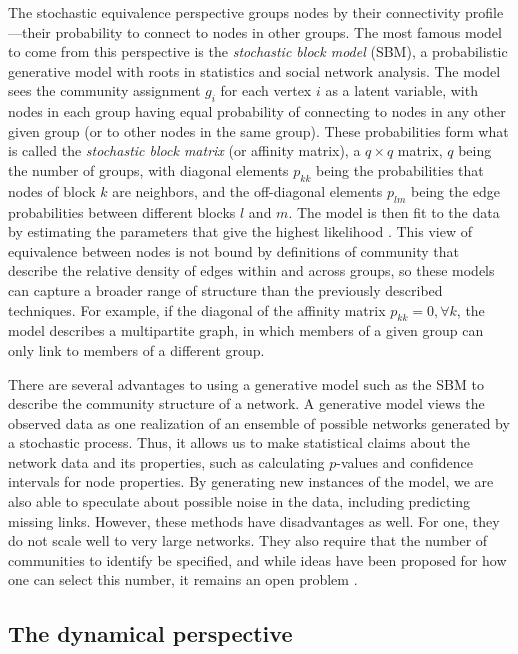 The stochastic equivalence perspective groups nodes by their
connectivity profile---their probability to connect to nodes in other
groups. The most famous model to come from this perspective is the
\emph{stochastic block model} (SBM), a probabilistic generative model
with roots in statistics and social network analysis. The model sees the
community assignment \(g_i\) for each vertex \(i\) as a latent variable,
with nodes in each group having equal probability of connecting to nodes
in any other given group (or to other nodes in the same group). These
probabilities form what is called the \emph{stochastic block matrix} (or
affinity matrix), a \(q \times q\) matrix, \(q\) being the number of
groups, with diagonal elements \(p_{kk}\) being the probabilities that
nodes of block \(k\) are neighbors, and the off-diagonal elements
\(p_{lm}\) being the edge probabilities between different blocks \(l\)
and \(m\). The model is then fit to the data by estimating the
parameters that give the highest likelihood
\autocites{fortunato_community_2016}{schaub_many_2017}. This view of
equivalence between nodes is not bound by definitions of community that
describe the relative density of edges within and across groups, so
these models can capture a broader range of structure than the
previously described techniques. For example, if the diagonal of the
affinity matrix \(p_{kk} = 0, \forall k\), the model describes a
multipartite graph, in which members of a given group can only link to
members of a different group.

There are several advantages to using a generative model such as the SBM
to describe the community structure of a network. A generative model
views the observed data as one realization of an ensemble of possible
networks generated by a stochastic process. Thus, it allows us to make
statistical claims about the network data and its properties, such as
calculating \(p\)-values and confidence intervals for node properties.
By generating new instances of the model, we are also able to speculate
about possible noise in the data, including predicting missing links.
However, these methods have disadvantages as well. For one, they do not
scale well to very large networks. They also require that the number of
communities to identify be specified, and while ideas have been proposed
for how one can select this number, it remains an open problem
\autocite{fortunato_community_2016}.

\hypertarget{the-dynamical-perspective}{\subsection{The dynamical
perspective}\label{the-dynamical-perspective}}

